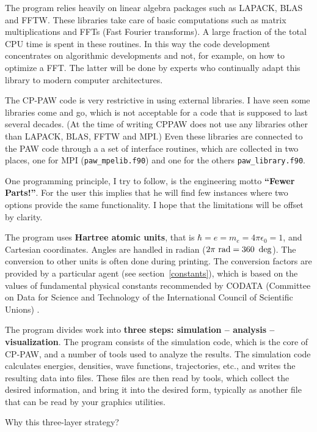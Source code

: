 \documentclass[final,12pt,makeidx,DIV=calc]{article}
\begin{document}
The program relies heavily on linear algebra packages such as LAPACK,
BLAS and FFTW. These libraries take care of basic computations such
as matrix multiplications and FFTs (Fast Fourier transforms). A large
fraction of the total CPU time is spent in these routines. In this way
the code development concentrates on algorithmic developments and not,
for example, on how to optimize a FFT.  The latter will be done by
experts who continually adapt this library to modern computer
architectures.

The CP-PAW code is very restrictive in using external libraries. I
have seen some libraries come and go, which is not acceptable for a
code that is supposed to last several decades. (At the time of writing
CPPAW does not use any libraries other than LAPACK, BLAS, FFTW and
MPI.) Even these libraries are connected to the PAW code through a a
set of interface routines, which are collected in two places, one for MPI (\verb|paw_mpelib.f90|) and one for the others \verb|paw_library.f90|. 

One programming principle, I try to follow, is the engineering
motto {\bf ``Fewer Parts!''}. For the user this implies that he will
find few instances where two options provide the same functionality. I
hope that the limitations will be offset by clarity.

The program uses \textbf{Hartree atomic units}, that is $\hbar=e=m_e=4\pi\epsilon_0=1$, and Cartesian
coordinates.  Angles are handled in radian ($2\pi{\rm\ rad}=
360~\deg$).  The conversion to other units is often done during
printing. The conversion factors are provided by a particular agent
(see section~\ref{constants}), which is based on the values of
fundamental physical constants recommended by CODATA
(Committee on Data for Science and Technology of the International
Council of Scientific Unions) \cite{mohr00_rmp72_351}.

The program divides work into {\bf three steps: simulation --
  analysis -- visualization}.  The program consists of the simulation
code, which is the core of CP-PAW, and a number of tools used to
analyze the results.  The simulation code calculates energies,
densities, wave functions, trajectories, etc., and writes the
resulting data into files.  These files are then read by tools, which
collect the desired information, and bring it into the desired
form, typically as another file that can be read by your graphics
utilities.

Why this three-layer strategy?
\end{document}
